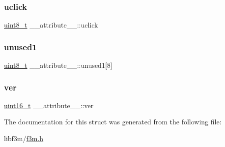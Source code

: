 \mbox{\label{struct____attribute_____a615d8deee60857f787edbe5a4f9b8663}} 
\subsubsection{\texorpdfstring{uclick}{uclick}}
{\footnotesize\ttfamily \hyperlink{inttypes_8h_aba7bc1797add20fe3efdf37ced1182c5}{uint8\+\_\+t} \+\_\+\+\_\+attribute\+\_\+\+\_\+\+::uclick}

\mbox{\label{struct____attribute_____a219da68c9162d77e0f6253829ef341b5}} 
\subsubsection{\texorpdfstring{unused1}{unused1}}
{\footnotesize\ttfamily \hyperlink{inttypes_8h_aba7bc1797add20fe3efdf37ced1182c5}{uint8\+\_\+t} \+\_\+\+\_\+attribute\+\_\+\+\_\+\+::unused1\mbox{[}8\mbox{]}}

\mbox{\label{struct____attribute_____a06fbe8067948a00f7c7d3b3972f1b944}} 
\subsubsection{\texorpdfstring{ver}{ver}}
{\footnotesize\ttfamily \hyperlink{inttypes_8h_a273cf69d639a59973b6019625df33e30}{uint16\+\_\+t} \+\_\+\+\_\+attribute\+\_\+\+\_\+\+::ver}



The documentation for this struct was generated from the following file\+:\begin{DoxyCompactItemize}
\item 
libf3m/\hyperlink{f3m_8h}{f3m.\+h}\end{DoxyCompactItemize}
